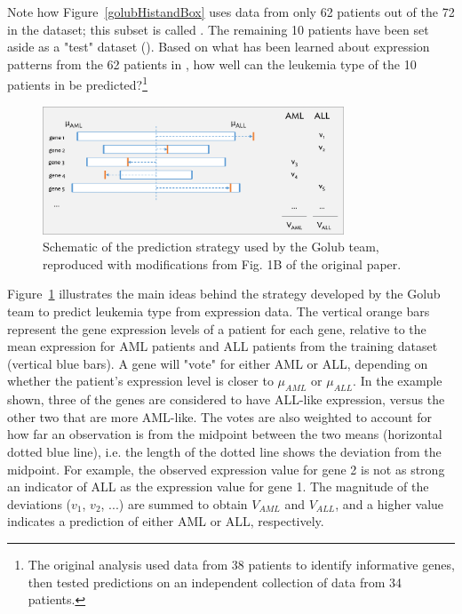 Note how Figure~\ref{golubHistandBox} uses data from only 62 patients out of the 72 in the  dataset; this subset is called . The remaining 10 patients have been set aside as a "test" dataset (). Based on what has been learned about expression patterns from the 62 patients in , how well can the leukemia type of the 10 patients in  be predicted?\footnote{The original analysis used data from 38 patients to identify informative genes, then tested predictions on an independent collection of data from 34 patients.}

\begin{figure}[h!]
	\centering
	{\includegraphics[width=0.80\textwidth]{ch_intro_to_data_oi_biostat/figures/golubPrediction/golubPrediction.png}
	\caption{Schematic of the prediction strategy used by the Golub team, reproduced with modifications from Fig. 1B of the original paper.
		\label{golubPrediction}}
	}
\end{figure}

Figure~\ref{golubPrediction} illustrates the main ideas behind the strategy developed by the Golub team to predict leukemia type from expression data. The vertical orange bars represent the gene expression levels of a patient for each gene, relative to the mean expression for AML patients and ALL patients from the training dataset (vertical blue bars). A gene will "vote" for either AML or ALL, depending on whether the patient's expression level is closer to $\mu_{AML}$ or $\mu_{ALL}$. In the example shown, three of the genes are considered to have ALL-like expression, versus the other two that are more AML-like. The votes are also weighted to account for how far an observation is from the midpoint between the two means (horizontal dotted blue line), i.e. the length of the dotted line shows the deviation from the midpoint. For example, the observed expression value for gene 2 is not as strong an indicator of ALL as the expression value for gene 1. The magnitude of the deviations ($v_1$, $v_2$, ...) are summed to obtain $V_{AML}$ and $V_{ALL}$, and a higher value indicates a prediction of either AML or ALL, respectively.


